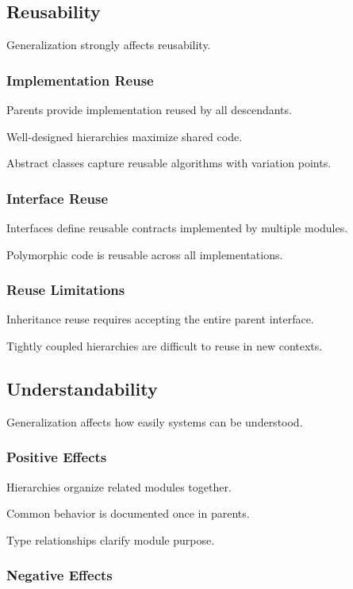 \documentclass[11pt]{article}
\begin{document}
\subsection{Reusability}

Generalization strongly affects reusability.

\subsubsection{Implementation Reuse}

Parents provide implementation reused by all descendants.

Well-designed hierarchies maximize shared code.

Abstract classes capture reusable algorithms with variation points.

\subsubsection{Interface Reuse}

Interfaces define reusable contracts implemented by multiple modules.

Polymorphic code is reusable across all implementations.

\subsubsection{Reuse Limitations}

Inheritance reuse requires accepting the entire parent interface.

Tightly coupled hierarchies are difficult to reuse in new contexts.

\subsection{Understandability}

Generalization affects how easily systems can be understood.

\subsubsection{Positive Effects}

Hierarchies organize related modules together.

Common behavior is documented once in parents.

Type relationships clarify module purpose.

\subsubsection{Negative Effects}
\end{document}
